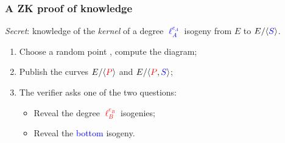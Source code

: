 \documentclass{beamer}
\newcommand{\bl}[1]{\textcolor{blue}{#1}}
\newcommand{\rd}[1]{\textcolor{red}{#1}}
\begin{document}

\begin{frame}
  \frametitle{A ZK proof of knowledge}
  
  \emph{Secret}: knowledge of the \emph{kernel} of a degree
  \bl{$\ell_A^{e_A}$} isogeny from $E$ to $E/\cyc{\bl{S}}$.

  \begin{center}
  \end{center}

  \begin{enumerate}
  \item<2-> Choose a random point , compute the diagram;
  \item<2-> Publish the curves $E/\cyc{\rd{P}}$ and $E/\cyc{\rd{P},\bl{S}}$;
  \item<3-> The verifier asks one of the two questions:
    \begin{itemize}
    \item<3-> Reveal the degree \rd{$\ell_B^{e_B}$} isogenies;
    \item<4-> Reveal the \bl{bottom} isogeny.
    \end{itemize}
  \end{enumerate}
\end{frame}  

\end{document}
